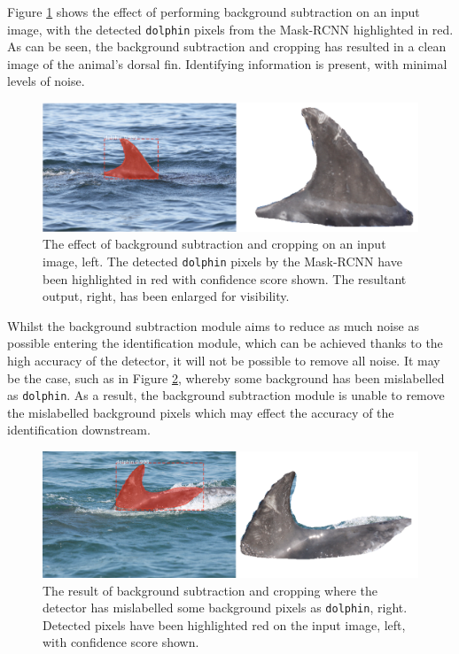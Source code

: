 Figure \ref{fig:fin-extraction-clean} shows the effect of performing background subtraction on an input image, with the detected \texttt{dolphin} pixels from the Mask-RCNN highlighted in red. As can be seen, the background subtraction and cropping has resulted in a clean image of the animal's dorsal fin. Identifying information is present, with minimal levels of noise. 

\begin{figure}[h]
	\begin{center}
		\includegraphics[scale=0.5]{Chapter4/figs/fin-extraction-clean.png}
	\end{center}
	\caption{The effect of background subtraction and cropping on an input image, left. The detected \texttt{dolphin} pixels by the Mask-RCNN have been highlighted in red with confidence score shown. The resultant output, right, has been enlarged for visibility.}
	\label{fig:fin-extraction-clean}
\end{figure}

Whilst the background subtraction module aims to reduce as much noise as possible entering the identification module, which can be achieved thanks to the high accuracy of the detector, it will not be possible to remove all noise. It may be the case, such as in Figure \ref{fig:fin-extraction-unclean}, whereby some background has been mislabelled as \texttt{dolphin}. As a result, the background subtraction module is unable to remove the mislabelled background pixels which may effect the accuracy of the identification downstream. 

\begin{figure}[h]
	\begin{center}
		\includegraphics[scale=0.5]{Chapter4/figs/fin-extraction-unclean.png}
	\end{center}
	\caption{The result of background subtraction and cropping where the detector has mislabelled some background pixels as \texttt{dolphin}, right. Detected pixels have been highlighted red on the input image, left, with confidence score shown.}
	\label{fig:fin-extraction-unclean}
\end{figure}





